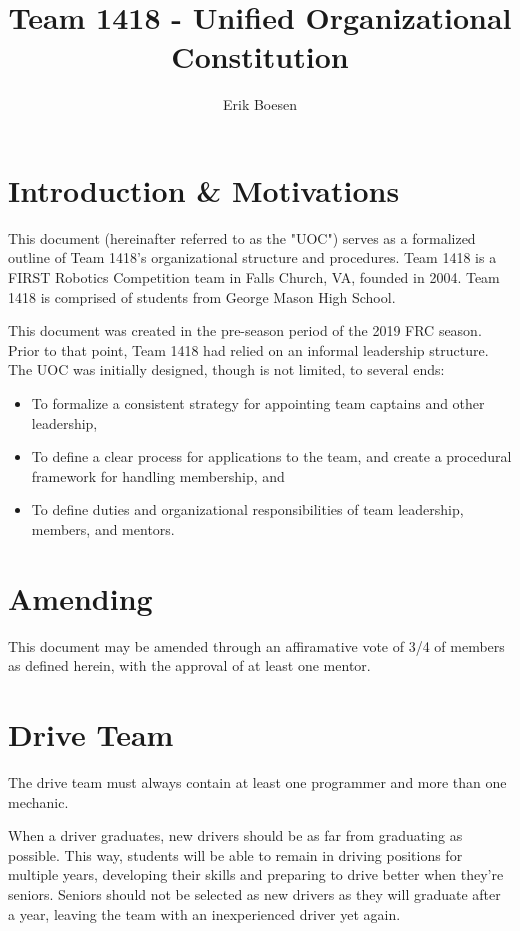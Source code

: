 \documentclass{proc}
\begin{document}
\title{Team 1418 - Unified Organizational Constitution}
\author{Erik Boesen}

\maketitle

\section{Introduction & Motivations}
This document (hereinafter referred to as the "UOC") serves as a formalized outline of Team 1418's organizational structure and procedures. Team 1418 is a FIRST Robotics Competition team in Falls Church, VA, founded in 2004. Team 1418 is comprised of students from George Mason High School.

This document was created in the pre-season period of the 2019 FRC season. Prior to that point, Team 1418 had relied on an informal leadership structure. The UOC was initially designed, though is not limited, to several ends:
\begin{itemize}
  \item{To formalize a consistent strategy for appointing team captains and other leadership,}
  \item{To define a clear process for applications to the team, and create a procedural framework for handling membership, and}
  \item{To define duties and organizational responsibilities of team leadership, members, and mentors.}
\end{itemize}

\section{Amending}
This document may be amended through an affiramative vote of 3/4 of members as defined herein, with the approval of at least one mentor.

\section{Drive Team}
The drive team must always contain at least one programmer and more than one mechanic.

When a driver graduates, new drivers should be as far from graduating as possible. This way, students will be able to remain in driving positions for multiple years, developing their skills and preparing to drive better when they're seniors. Seniors should not be selected as new drivers as they will graduate after a year, leaving the team with an inexperienced driver yet again.
\end{document}
